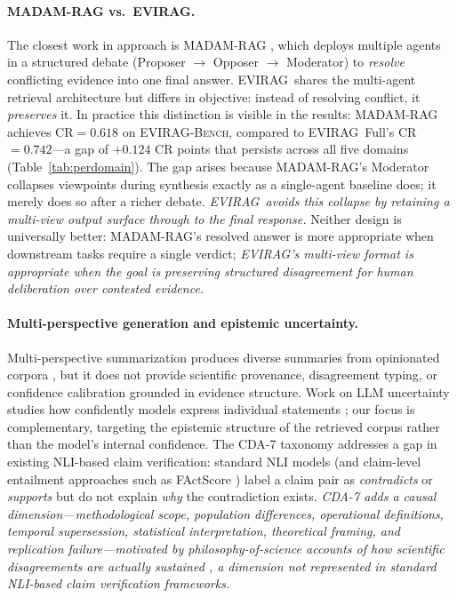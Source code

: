 \documentclass[11pt]{article}
\newcommand{\system}{\textsc{EVIRAG}\xspace}
\newcommand{\bench}{\textsc{EVIRAG-Bench}\xspace}
\begin{document}
\paragraph{MADAM-RAG vs.\ \system.}
The closest work in approach is MADAM-RAG \citep{wang2025conflicting}, which
deploys multiple agents in a structured debate (Proposer $\to$ Opposer $\to$
Moderator) to \emph{resolve} conflicting evidence into one final answer.
\system\ shares the multi-agent retrieval architecture but differs in
objective: instead of resolving conflict, it \emph{preserves} it.  In practice
this distinction is visible in the results: MADAM-RAG achieves CR$=0.618$
on \bench, compared to \system\ Full's CR$=0.742$---a gap of $+0.124$
CR points that persists across all five domains (Table~\ref{tab:perdomain}).
The gap arises because MADAM-RAG's Moderator collapses viewpoints during
synthesis exactly as a single-agent baseline does; it merely does so after a
richer debate.  \textit{\textup{\system}\ avoids this collapse by retaining a multi-view
output surface through to the final response.}  Neither design is universally
better: MADAM-RAG's resolved answer is more appropriate when downstream tasks
require a single verdict; \textit{\textup{\system}'s multi-view format is
appropriate when the goal is preserving structured disagreement for human
deliberation over contested evidence.}

\paragraph{Multi-perspective generation and epistemic uncertainty.}
Multi-perspective summarization produces diverse summaries from opinionated
corpora \citep{bravzinskas2020few,hayashi2021wikiasp}, but it does not provide
scientific provenance, disagreement typing, or confidence calibration grounded
in evidence structure.  Work on LLM uncertainty studies how confidently models
express individual statements \citep{xiong2024llms,kadavath2022language}; our
focus is complementary, targeting the epistemic structure of the retrieved
corpus rather than the model's internal confidence.  The CDA-7 taxonomy
addresses a gap in existing NLI-based claim verification: standard NLI
models (and claim-level entailment approaches such as FActScore
\citep{min2023factscore}) label a claim pair as \emph{contradicts} or
\emph{supports} but do not explain \emph{why} the contradiction exists.
\textit{CDA-7 adds a causal dimension---methodological scope, population
differences, operational definitions, temporal supersession, statistical
interpretation, theoretical framing, and replication failure---motivated by
philosophy-of-science accounts of how scientific disagreements are actually
sustained \citep{longino2002science,solomon2001social}, a dimension not
represented in standard NLI-based claim verification frameworks.}
\end{document}
